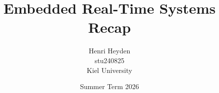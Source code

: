 


\title{Embedded Real-Time Systems \\ \small Recap}
\date{Summer Term 2026}
\author{Henri Heyden \\%
    \small stu240825 \\%
    \small Kiel University%
}


\maketitle
\restoregeometry



\tableofcontents





